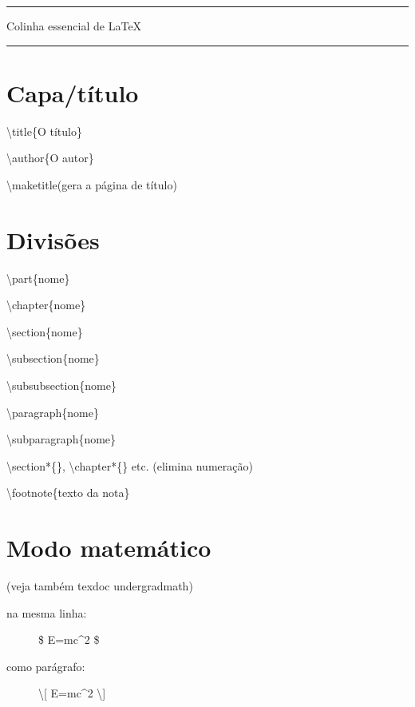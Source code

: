 \documentclass[10pt,twoside,english,brazilian]{article}
\begin{document}
{
  \centering
  \Large\bfseries

  \rule[.6ex]{.2\textwidth}{1pt}
  \quad\space Colinha essencial de \LaTeX \quad\space
  \rule[.6ex]{.2\textwidth}{1pt}\par
}

\setlength{\columnsep}{20pt}
\setlength{\columnseprule}{.2pt}
\begin{multicols}{3}

\section*{Capa/título}

\textbackslash{}title\{O título\}

\textbackslash{}author\{O autor\}

\textbackslash{}maketitle\quad (gera a página de título)


\section*{Divisões}

\textbackslash{}part\{nome\}

\textbackslash{}chapter\{nome\}

\textbackslash{}section\{nome\}

\textbackslash{}subsection\{nome\}

\textbackslash{}subsubsection\{nome\}

\textbackslash{}paragraph\{nome\}

\textbackslash{}subparagraph\{nome\}

\textbackslash{}section*\{\},
\textbackslash{}chapter*\{\} etc.\quad
(elimina numeração)


\vspace{\baselineskip}


\textbackslash{}footnote\{texto da nota\}


\section*{Modo matemático}

(veja também \textsf{texdoc undergradmath})


\vspace{\baselineskip}


\begin{description}
  \item[na mesma linha:] \$ E=mc\^{}2 \$
  \item[como parágrafo:] \textbackslash[ E=mc\^{}2 \textbackslash]
\end{description}



\end{multicols}
\end{document}
